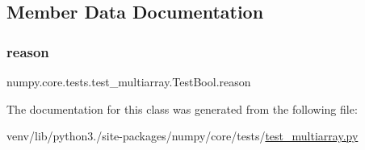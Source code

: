 \subsection{Member Data Documentation}
\mbox{\label{classnumpy_1_1core_1_1tests_1_1test__multiarray_1_1TestBool_a850d97285fd69123ad8dcf6559cb191c}} 
\subsubsection{\texorpdfstring{reason}{reason}}
{\footnotesize\ttfamily numpy.\+core.\+tests.\+test\+\_\+multiarray.\+Test\+Bool.\+reason\hspace{0.3cm}{\ttfamily [static]}}



The documentation for this class was generated from the following file\+:\begin{DoxyCompactItemize}
\item 
venv/lib/python3./site-\/packages/numpy/core/tests/\hyperlink{core_2tests_2test__multiarray_8py}{test\+\_\+multiarray.\+py}\end{DoxyCompactItemize}
